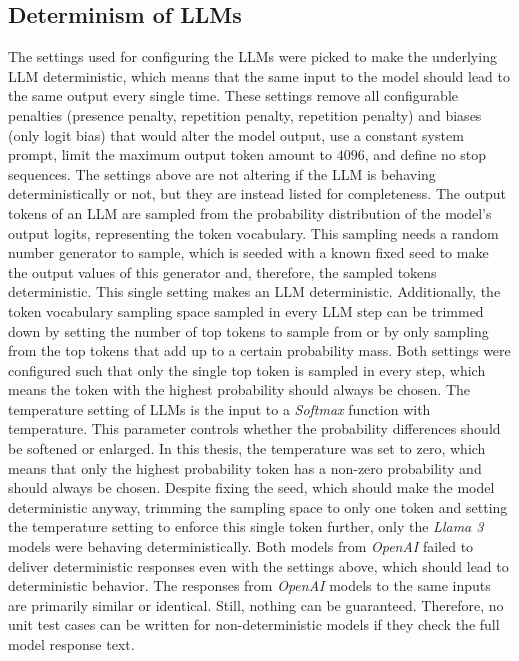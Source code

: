 \documentclass[draft,final]{thesisclass} %
\begin{document}
\subsection{Determinism of \gls{LLM}s}
The settings used for configuring the \gls{LLM}s were picked to make the underlying \gls{LLM} deterministic, which means that the same input to the model should lead to the same output every single time.
These settings remove all configurable penalties (presence penalty, repetition penalty, repetition penalty) and biases (only logit bias) that would alter the model output, use a constant system prompt, limit the maximum output token amount to $4096$, and define no stop sequences.
The settings above are not altering if the \gls{LLM} is behaving deterministically or not, but they are instead listed for completeness.
The output tokens of an \gls{LLM} are sampled from the probability distribution of the model's output logits, representing the token vocabulary.
This sampling needs a random number generator to sample, which is seeded with a known fixed seed to make the output values of this generator and, therefore, the sampled tokens deterministic.
This single setting makes an \gls{LLM} deterministic.
Additionally, the token vocabulary sampling space sampled in every \gls{LLM} step can be trimmed down by setting the number of top tokens to sample from or by only sampling from the top tokens that add up to a certain probability mass.
Both settings were configured such that only the single top token is sampled in every step, which means the token with the highest probability should always be chosen.
The temperature setting of \gls{LLM}s is the input to a \textit{Softmax} function with temperature. This parameter controls whether the probability differences should be softened or enlarged.
In this thesis, the temperature was set to zero, which means that only the highest probability token has a non-zero probability and should always be chosen.
Despite fixing the seed, which should make the model deterministic anyway, trimming the sampling space to only one token and setting the temperature setting to enforce this single token further, only the \textit{Llama 3} models were behaving deterministically.
Both models from \textit{OpenAI} failed to deliver deterministic responses even with the settings above, which should lead to deterministic behavior.
The responses from \textit{OpenAI} models to the same inputs are primarily similar or identical. Still, nothing can be guaranteed. Therefore, no unit test cases can be written for non-deterministic models if they check the full model response text.
\end{document}
